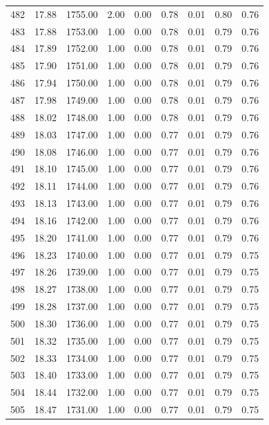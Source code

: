 \documentclass{article}\usepackage[]{graphicx}\usepackage[]{color}
\begin{document}
\begin{longtable}{rrrrrrrrr}
  482 & 17.88 & 1755.00 & 2.00 & 0.00 & 0.78 & 0.01 & 0.80 & 0.76 \\ 
  483 & 17.88 & 1753.00 & 1.00 & 0.00 & 0.78 & 0.01 & 0.79 & 0.76 \\ 
  484 & 17.89 & 1752.00 & 1.00 & 0.00 & 0.78 & 0.01 & 0.79 & 0.76 \\ 
  485 & 17.90 & 1751.00 & 1.00 & 0.00 & 0.78 & 0.01 & 0.79 & 0.76 \\ 
  486 & 17.94 & 1750.00 & 1.00 & 0.00 & 0.78 & 0.01 & 0.79 & 0.76 \\ 
  487 & 17.98 & 1749.00 & 1.00 & 0.00 & 0.78 & 0.01 & 0.79 & 0.76 \\ 
  488 & 18.02 & 1748.00 & 1.00 & 0.00 & 0.78 & 0.01 & 0.79 & 0.76 \\ 
  489 & 18.03 & 1747.00 & 1.00 & 0.00 & 0.77 & 0.01 & 0.79 & 0.76 \\ 
  490 & 18.08 & 1746.00 & 1.00 & 0.00 & 0.77 & 0.01 & 0.79 & 0.76 \\ 
  491 & 18.10 & 1745.00 & 1.00 & 0.00 & 0.77 & 0.01 & 0.79 & 0.76 \\ 
  492 & 18.11 & 1744.00 & 1.00 & 0.00 & 0.77 & 0.01 & 0.79 & 0.76 \\ 
  493 & 18.13 & 1743.00 & 1.00 & 0.00 & 0.77 & 0.01 & 0.79 & 0.76 \\ 
  494 & 18.16 & 1742.00 & 1.00 & 0.00 & 0.77 & 0.01 & 0.79 & 0.76 \\ 
  495 & 18.20 & 1741.00 & 1.00 & 0.00 & 0.77 & 0.01 & 0.79 & 0.76 \\ 
  496 & 18.23 & 1740.00 & 1.00 & 0.00 & 0.77 & 0.01 & 0.79 & 0.75 \\ 
  497 & 18.26 & 1739.00 & 1.00 & 0.00 & 0.77 & 0.01 & 0.79 & 0.75 \\ 
  498 & 18.27 & 1738.00 & 1.00 & 0.00 & 0.77 & 0.01 & 0.79 & 0.75 \\ 
  499 & 18.28 & 1737.00 & 1.00 & 0.00 & 0.77 & 0.01 & 0.79 & 0.75 \\ 
  500 & 18.30 & 1736.00 & 1.00 & 0.00 & 0.77 & 0.01 & 0.79 & 0.75 \\ 
  501 & 18.32 & 1735.00 & 1.00 & 0.00 & 0.77 & 0.01 & 0.79 & 0.75 \\ 
  502 & 18.33 & 1734.00 & 1.00 & 0.00 & 0.77 & 0.01 & 0.79 & 0.75 \\ 
  503 & 18.40 & 1733.00 & 1.00 & 0.00 & 0.77 & 0.01 & 0.79 & 0.75 \\ 
  504 & 18.44 & 1732.00 & 1.00 & 0.00 & 0.77 & 0.01 & 0.79 & 0.75 \\ 
  505 & 18.47 & 1731.00 & 1.00 & 0.00 & 0.77 & 0.01 & 0.79 & 0.75 \\ 

\end{longtable}
\end{document}

